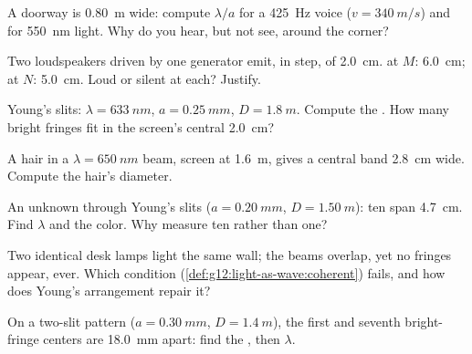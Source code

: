\begin{exercise}[$\star$]\label{exo:g12:light-as-wave:3}
A doorway is \qty{0.80}{m} wide: compute $\lambda/a$ for a
\qty{425}{Hz} voice ($v = \qty{340}{m/s}$) and for \qty{550}{nm}
light. Why do you hear, but not see, around the corner?
\end{exercise}

\begin{exercise}[$\star$]\label{exo:g12:light-as-wave:4}
Two loudspeakers driven by one generator emit, in step,  of
 \qty{2.0}{cm}.  at $M$: \qty{6.0}{cm}; at
$N$: \qty{5.0}{cm}. Loud or silent at each? Justify.
\end{exercise}

\begin{exercise}[$\star$]\label{exo:g12:light-as-wave:5}
Young's slits: $\lambda = \qty{633}{nm}$, $a = \qty{0.25}{mm}$,
$D = \qty{1.8}{m}$. Compute the . How many bright fringes
fit in the screen's central \qty{2.0}{cm}?
\end{exercise}

\begin{exercise}[$\star\star$]\label{exo:g12:light-as-wave:6}
A hair in a $\lambda = \qty{650}{nm}$ beam, screen at \qty{1.6}{m},
gives a central band \qty{2.8}{cm} wide. Compute the hair's diameter.
\end{exercise}

\begin{exercise}[$\star\star$]\label{exo:g12:light-as-wave:7}
An unknown  through Young's slits ($a = \qty{0.20}{mm}$,
$D = \qty{1.50}{m}$): ten  span \qty{4.7}{cm}. Find
$\lambda$ and the color. Why measure ten rather than one?
\end{exercise}

\begin{exercise}[$\star\star$]\label{exo:g12:light-as-wave:8}
Two identical desk lamps light the same wall; the beams overlap, yet
no fringes appear, ever. Which  condition
(\cref{def:g12:light-as-wave:coherent}) fails, and how does Young's
arrangement repair it?
\end{exercise}

\begin{exercise}[$\star\star$]\label{exo:g12:light-as-wave:9}
On a two-slit pattern ($a = \qty{0.30}{mm}$, $D = \qty{1.4}{m}$), the
first and seventh bright-fringe centers are \qty{18.0}{mm} apart:
find the , then $\lambda$.
\end{exercise}

